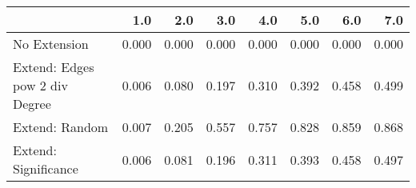 \begin{tabular}{lrrrrrrr}
\toprule
{} &   1.0 &   2.0 &   3.0 &   4.0 &   5.0 &   6.0 &   7.0 \\
\midrule
No Extension                   & 0.000 & 0.000 & 0.000 & 0.000 & 0.000 & 0.000 & 0.000 \\
Extend: Edges pow 2 div Degree & 0.006 & 0.080 & 0.197 & 0.310 & 0.392 & 0.458 & 0.499 \\
Extend: Random                 & 0.007 & 0.205 & 0.557 & 0.757 & 0.828 & 0.859 & 0.868 \\
Extend: Significance           & 0.006 & 0.081 & 0.196 & 0.311 & 0.393 & 0.458 & 0.497 \\
\bottomrule
\end{tabular}

